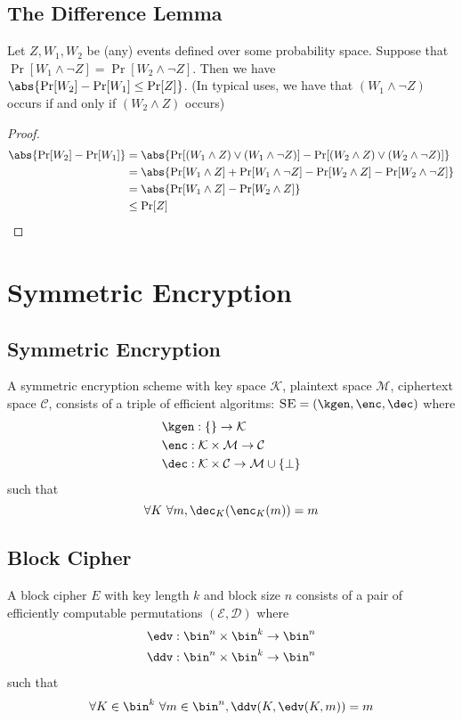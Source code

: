 \documentclass[11pt,a4paper]{article}
\newcommand{\SE}{\textsc{SE}}
\begin{document}
\subsection{The Difference Lemma}
Let $Z, W_1, W_2$ be (any) events defined over some probability space. Suppose that $\Pr[W_1 \wedge \neg Z] = \Pr[W_2 \wedge \neg Z]$. Then we have $\abs{\Pr[W_2] - \Pr[W_1] \leq \Pr[Z]}$. (In typical uses, we have that $(W_1 \wedge \neg Z)$ occurs if and only if $(W_2 \wedge Z)$ occurs)

\begin{proof}
$$
\begin{aligned}
\abs{\Pr[W_2] - \Pr[W_1]} &= \abs{\Pr[(W_1 \wedge Z) \vee (W_1 \wedge \neg Z)]  -\Pr[(W_2 \wedge Z) \vee (W_2 \wedge \neg Z)] } \\ 
&= \abs{\Pr[W_1 \wedge Z] + \Pr[W_1 \wedge \neg Z]  - \Pr[W_2 \wedge Z] - \Pr[W_2 \wedge \neg Z] } \\ 
&= \abs{\Pr[W_1 \wedge Z] - \Pr[W_2 \wedge Z]} \\
&\leq \Pr[Z]
\end{aligned}
$$
\end{proof}



\newpage
\section{Symmetric Encryption}
\subsection{Symmetric Encryption}
A symmetric encryption scheme with key space $\mathcal{K}$, plaintext space $\mathcal{M}$, ciphertext space $\mathcal{C}$, consists of a triple of efficient algoritms: $\SE = (\kgen, \enc, \dec)$ where  
$$
\begin{aligned}
&\kgen: \{\} \rightarrow \mathcal{K} \\
&\enc: \mathcal{K} \times \mathcal{M} \rightarrow \mathcal{C} \\
&\dec: \mathcal{K} \times \mathcal{C} \rightarrow \mathcal{M} \cup \{\bot\}
\end{aligned}
$$
such that 
$$
\forall K \ \forall m, \dec_K(\enc_K(m)) = m
$$

\subsection{Block Cipher}
A block cipher $E$ with key length $k$ and block size $n$ consists of a pair of efficiently computable permutations $(\mathcal{E}, \mathcal{D})$ where 
$$
\begin{aligned}
&\edv: \bin^n \times \bin^k \rightarrow \bin^n \\
&\ddv: \bin^n \times \bin^k \rightarrow \bin^n
\end{aligned}
$$ 
such that 
$$
\forall K \in \bin^k \ \forall m \in \bin^n, \ddv(K, \edv(K, m)) = m
$$
\end{document}

